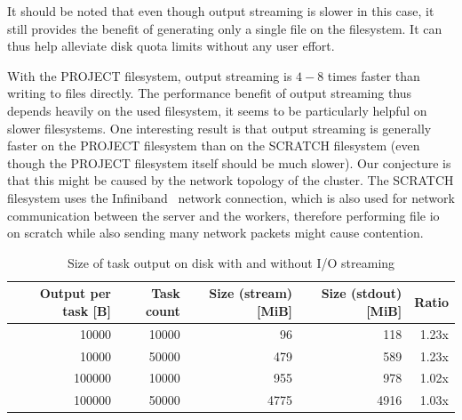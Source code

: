 It should be noted that even though output streaming is slower in this case, it still provides the
benefit of generating only a single file on the filesystem. It can thus help alleviate disk quota
limits without any user effort.

With the PROJECT filesystem, output streaming is $4-8$ times faster than writing
to files directly. The performance benefit of output streaming thus depends heavily on the used
filesystem, it seems to be particularly helpful on slower filesystems. One interesting result is
that output streaming is generally faster on the PROJECT filesystem than on the SCRATCH filesystem
(even though the PROJECT filesystem itself should be much slower). Our conjecture is that this
might be caused by the network topology of the cluster. The SCRATCH filesystem uses the
Infiniband~\cite{infiniband} network connection, which is also used for network communication
between the server and the workers, therefore performing file \gls{io} on scratch
while also sending many network packets might cause contention.


\begin{table}[h]
	\centering
	\begin{tabular}{|r|r|r|r|r|}
		\hline
		Output per task [B] & Task count & Size (stream) [MiB] & Size (stdout) [MiB] & Ratio \\ \hline
		10000               & 10000      & 96                  & 118                 & 1.23x \\ \hline
		10000               & 50000      & 479                 & 589                 & 1.23x \\ \hline
		100000              & 10000      & 955                 & 978                 & 1.02x \\ \hline
		100000              & 50000      & 4775                & 4916                & 1.03x \\ \hline
	\end{tabular}
	\caption{Size of task output on disk with and without I/O streaming}
	\label{tab:hq-io-streaming-size}
\end{table}

